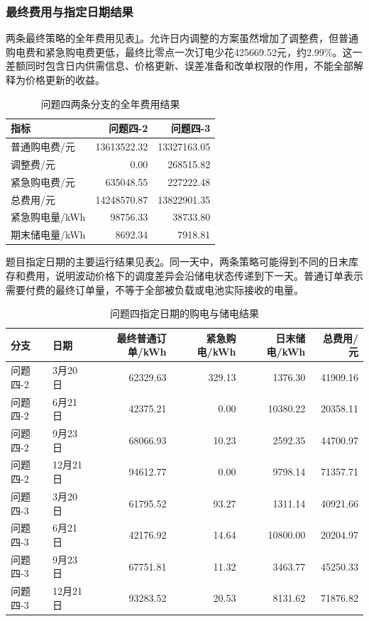 \documentclass[11pt,a4paper]{article}
\begin{document}
\subsubsection{最终费用与指定日期结果}

两条最终策略的全年费用见表\ref{tab:q4result}。允许日内调整的方案虽然增加了调整费，但普通购电费和紧急购电费更低，最终比零点一次订电少花425669.52元，约2.99\%。这一差额同时包含日内供需信息、价格更新、误差准备和改单权限的作用，不能全部解释为价格更新的收益。

\begin{table}[htbp]
\centering\small
\caption{问题四两条分支的全年费用结果}
\label{tab:q4result}
\begin{tabular}{lrr}
\toprule
指标 & 问题四-2 & 问题四-3 \\
\midrule
普通购电费/元 & 13613522.32 & 13327163.05 \\
调整费/元 & 0.00 & 268515.82 \\
紧急购电费/元 & 635048.55 & 227222.48 \\
总费用/元 & 14248570.87 & 13822901.35 \\
紧急购电量/kWh & 98756.33 & 38733.80 \\
期末储电量/kWh & 8692.34 & 7918.81 \\
\bottomrule
\end{tabular}
\end{table}

题目指定日期的主要运行结果见表\ref{tab:q4days}。同一天中，两条策略可能得到不同的日末库存和费用，说明波动价格下的调度差异会沿储电状态传递到下一天。普通订单表示需要付费的最终订单量，不等于全部被负载或电池实际接收的电量。

\begin{table}[htbp]
\centering\footnotesize
\caption{问题四指定日期的购电与储电结果}
\label{tab:q4days}
\begin{tabular}{llrrrr}
\toprule
分支 & 日期 & 最终普通订单/kWh & 紧急购电/kWh & 日末储电/kWh & 总费用/元 \\
\midrule
问题四-2 & 3月20日 & 62329.63 & 329.13 & 1376.30 & 41909.16 \\
问题四-2 & 6月21日 & 42375.21 & 0.00 & 10380.22 & 20358.11 \\
问题四-2 & 9月23日 & 68066.93 & 10.23 & 2592.35 & 44700.97 \\
问题四-2 & 12月21日 & 94612.77 & 0.00 & 9798.14 & 71357.71 \\
问题四-3 & 3月20日 & 61795.52 & 93.27 & 1311.14 & 40921.66 \\
问题四-3 & 6月21日 & 42176.92 & 14.64 & 10800.00 & 20204.97 \\
问题四-3 & 9月23日 & 67751.81 & 11.32 & 3463.77 & 45250.33 \\
问题四-3 & 12月21日 & 93283.52 & 20.53 & 8131.62 & 71876.82 \\
\bottomrule
\end{tabular}
\end{table}
\end{document}

